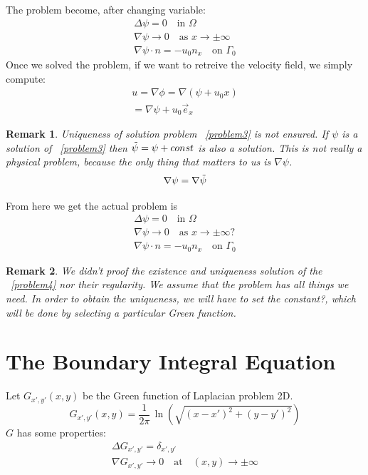 \documentclass[a4paper,12pt]{article}
\newtheorem{remark}{Remark}
\begin{document}
The problem become, after changing variable:
\begin{align}  \label{problem3}
\Delta \psi=0 \quad \text{in } \Omega\\
\nabla\psi \to 0 \quad \text{as } x\to\pm\infty\\
\nabla\psi \cdot n = -u_0 n_x \quad \text{on } \Gamma_0 
\end{align}
Once we solved the problem, if we want to retreive the velocity field, we simply compute:
\begin{align}
 u=\nabla\phi=\nabla(\psi+u_0 x)\\
= \nabla\psi+u_0 \vec{e}_x
\end{align}
\begin{remark}
 Uniqueness of solution problem ~\eqref{problem3} is not ensured. If $\psi$ is a solution of ~\eqref{problem3} then
$\Tilde{\psi} = \psi+const$ is also a solution. This is not really a physical problem, because the only thing that
matters to us is $\nabla\psi$. 
\begin{equation}
 \nabla \psi=\nabla\Tilde{\psi}
\end{equation}
\end{remark}
From here we get the actual problem is
\begin{align}  \label{problem4}
\Delta \psi=0 \quad \text{in } \Omega\\
\nabla\psi \to 0 \quad \text{as } x\to\pm\infty ?\\
\nabla\psi \cdot n = -u_0 n_x \quad \text{on } \Gamma_0 
\end{align}

\begin{remark}
 We didn't proof the existence and uniqueness solution of the ~\eqref{problem4} nor their regularity. We assume that 
the problem has all things we need.
In order to obtain the uniqueness, we will have to set the constant?, which will be done by selecting a particular Green function.
\end{remark}

\section{The Boundary Integral Equation}

Let $G_{x',y'} (x,y)$ be the Green function of Laplacian problem 2D.
\begin{equation} \label{GreenFunction}
 G_{x',y'}(x,y)=\dfrac{1}{2 \pi} \, \ln(\sqrt{(x-x')^2+(y-y')^2})
\end{equation}
$G$ has some properties:
\begin{align}
 \Delta G_{x',y'}=\delta_{x',y'}\\
 \nabla G_{x',y'}\to0\quad \text{at}\quad (x,y)\to\pm \infty
\end{align}
\end{document}
